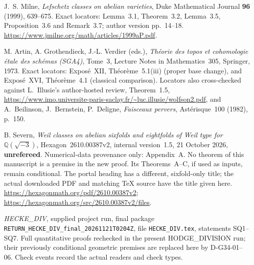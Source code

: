 J.~S. Milne, \emph{Lefschetz classes on abelian varieties}, Duke Mathematical
Journal \textbf{96} (1999), 639--675.  Exact locators: Lemma~3.1,
Theorem~3.2, Lemma~3.5, Proposition~3.6 and Remark~3.7;
author version pp.~14--18.
\url{https://www.jmilne.org/math/articles/1999aP.pdf}.

M. Artin, A. Grothendieck, J.-L. Verdier (eds.), \emph{Th\'eorie des topos
et cohomologie \'etale des sch\'emas (SGA4)}, Tome~3, Lecture Notes in
Mathematics~305, Springer, 1973.  Exact locators: Expos\'e~XII,
Th\'eor\`eme~5.1(iii) (proper base change), and Expos\'e~XVI,
Th\'eor\`eme~4.1 (classical comparison).  Locators also cross-checked
against L.~Illusie's author-hosted review, Theorem~1.5,
\url{https://www.imo.universite-paris-saclay.fr/~luc.illusie/wolfson2.pdf},
and A.~Beilinson, J.~Bernstein, P.~Deligne, \emph{Faisceaux pervers},
Ast\'erisque~100 (1982), p.~150.

B. Severn, \emph{Weil classes on abelian sixfolds and eightfolds of Weil type
for \(\mathbb Q(\sqrt{-3})\)}, Hexagon~2610.00387v2, internal version~1.5,
21 October 2026, \textbf{unrefereed}.  Numerical-data provenance only:
Appendix~A.  No theorem of this manuscript is a premise in the new proof.
Its Theorems~A--C, if used as inputs, remain conditional.  The portal heading
has a different, sixfold-only title; the actual downloaded PDF and matching
TeX source have the title given here.
\url{https://hexagonmath.org/pdf/2610.00387v2};
\url{https://hexagonmath.org/src/2610.00387v2/files}.

\emph{HECKE\_DIV}, supplied project run, final package
\texttt{RETURN\_HECKE\_DIV\_final\_20261121T0204Z},
file \texttt{HECKE\_DIV.tex}, statements SQ1--SQ7.
Full quantitative proofs rechecked in the present HODGE\_DIVISION run;
their previously conditional geometric premises are replaced here by
D-G34-01--06.  Check events record the actual readers and check types.
